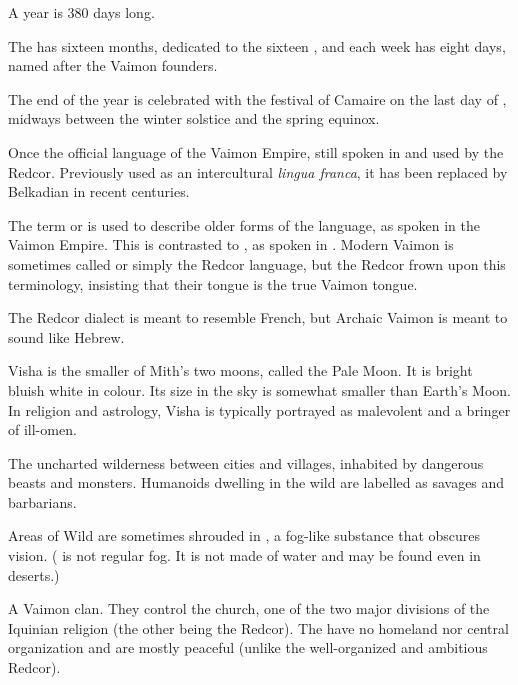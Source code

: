 \begin{gloss}
A year is 380 days long. 

The \ImperialCalendar has sixteen months, dedicated to the sixteen \Sephiroth{}, and each week has eight days, named after the Vaimon founders. 

The end of the year is celebrated with the festival of Camaire on the last day of \Gamishiel{}, midways between the winter solstice and the spring equinox. 



Once the official language of the Vaimon Empire, still spoken in \Redce{} and used by the Redcor. Previously used as an intercultural \emph{lingua franca}, it has been replaced by Belkadian in recent centuries. 

The term  or  is used to describe older forms of the language, as spoken in the Vaimon Empire. This is contrasted to , as spoken in \Redce. Modern Vaimon is sometimes called  or simply the Redcor language, but the Redcor frown upon this terminology, insisting that their tongue is the true Vaimon tongue. 

The Redcor dialect is meant to resemble French, but Archaic Vaimon is meant to sound like Hebrew. 



\gitem{\IC{}}
\seee{\ImperialCalendar}



Visha is the smaller of Mith's two moons, called the Pale Moon. It is bright bluish white in colour. Its size in the sky is somewhat smaller than Earth's Moon. In religion and astrology, Visha is typically portrayed as malevolent and a bringer of ill-omen. 



The uncharted wilderness between cities and villages, inhabited by dangerous beasts and monsters. %
Humanoids dwelling in the wild are labelled as savages and barbarians. 

\index{\wildfog}
Areas of Wild are sometimes shrouded in \wildfog, a fog-like substance that obscures vision. (\Wildfog{} is not regular fog. It is not made of water and may be found even in deserts.) 



\gitem{\Yrgell}
A Vaimon clan. They control the \Yrgell{} church, one of the two major divisions of the Iquinian religion (the other being the Redcor). The \Yrgell{} have no homeland nor central organization and are mostly peaceful (unlike the well-organized and ambitious Redcor). 



\end{gloss}











